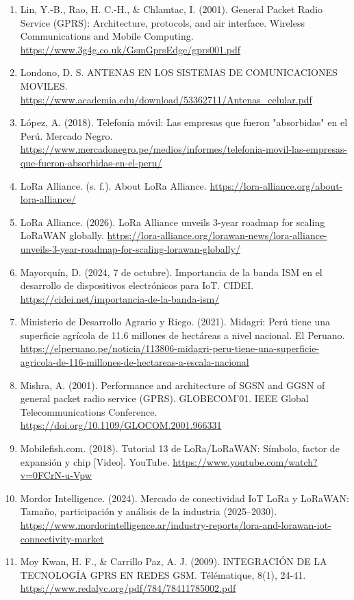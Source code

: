 \documentclass[12pt,a4paper]{article}
\begin{document}
\begin{enumerate}
    \item Lin, Y.-B., Rao, H. C.-H., \& Chlamtac, I. (2001). General Packet Radio Service (GPRS): Architecture, protocols, and air interface. Wireless Communications and Mobile Computing. \url{https://www.3g4g.co.uk/GsmGprsEdge/gprs001.pdf}
    \item Londono, D. S. ANTENAS EN LOS SISTEMAS DE COMUNICACIONES MOVILES. \url{https://www.academia.edu/download/53362711/Antenas_celular.pdf}
    \item López, A. (2018). Telefonía móvil: Las empresas que fueron "absorbidas" en el Perú. Mercado Negro. \url{https://www.mercadonegro.pe/medios/informes/telefonia-movil-las-empresas-que-fueron-absorbidas-en-el-peru/}
    \item LoRa Alliance. (s. f.). About LoRa Alliance. \url{https://lora-alliance.org/about-lora-alliance/}
    \item LoRa Alliance. (2026). LoRa Alliance unveils 3-year roadmap for scaling LoRaWAN globally. \url{https://lora-alliance.org/lorawan-news/lora-alliance-unveils-3-year-roadmap-for-scaling-lorawan-globally/}
    \item Mayorquín, D. (2024, 7 de octubre). Importancia de la banda ISM en el desarrollo de dispositivos electrónicos para IoT. CIDEI. \url{https://cidei.net/importancia-de-la-banda-ism/}
    \item Ministerio de Desarrollo Agrario y Riego. (2021). Midagri: Perú tiene una superficie agrícola de 11.6 millones de hectáreas a nivel nacional. El Peruano. \url{https://elperuano.pe/noticia/113806-midagri-peru-tiene-una-superficie-agricola-de-116-millones-de-hectareas-a-escala-nacional}
    \item Mishra, A. (2001). Performance and architecture of SGSN and GGSN of general packet radio service (GPRS). GLOBECOM'01. IEEE Global Telecommunications Conference. \url{https://doi.org/10.1109/GLOCOM.2001.966331}
    \item Mobilefish.com. (2018). Tutorial 13 de LoRa/LoRaWAN: Símbolo, factor de expansión y chip [Video]. YouTube. \url{https://www.youtube.com/watch?v=0FCrN-u-Vpw}
    \item Mordor Intelligence. (2024). Mercado de conectividad IoT LoRa y LoRaWAN: Tamaño, participación y análisis de la industria (2025–2030). \url{https://www.mordorintelligence.ar/industry-reports/lora-and-lorawan-iot-connectivity-market}
    \item Moy Kwan, H. F., \& Carrillo Paz, A. J. (2009). INTEGRACIÓN DE LA TECNOLOGÍA GPRS EN REDES GSM. Télématique, 8(1), 24-41. \url{https://www.redalyc.org/pdf/784/78411785002.pdf}

\end{enumerate}
\end{document}

